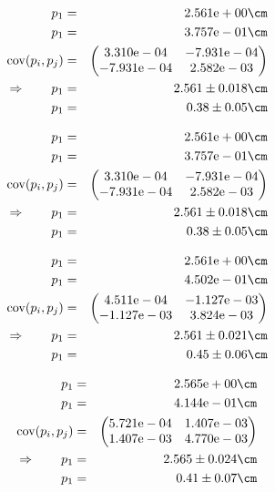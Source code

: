\begin{eqnarray}
    p_1 &=& 2.561\mathrm{e}+00 \cm \nonumber \\
    p_1 &=& 3.757\mathrm{e}-01 \cm \nonumber \\
    \mathrm{cov}(p_i, p_j) &=& 
    \begin{pmatrix}
        3.310\mathrm{e}-04 &-7.931\mathrm{e}-04 \\
        -7.931\mathrm{e}-04 &2.582\mathrm{e}-03 \\
    \end{pmatrix}
\\ \Rightarrow \qquad
    p_1 &=& 2.561 \pm 0.018 \cm\\
    p_1 &=& 0.38 \pm 0.05 \cm
\end{eqnarray}

\begin{eqnarray}
    p_1 &=& 2.561\mathrm{e}+00 \cm \nonumber \\
    p_1 &=& 3.757\mathrm{e}-01 \cm \nonumber \\
    \mathrm{cov}(p_i, p_j) &=& 
    \begin{pmatrix}
        3.310\mathrm{e}-04 &-7.931\mathrm{e}-04 \\
        -7.931\mathrm{e}-04 &2.582\mathrm{e}-03 \\
    \end{pmatrix}
\\ \Rightarrow \qquad
    p_1 &=& 2.561 \pm 0.018 \cm\\
    p_1 &=& 0.38 \pm 0.05 \cm
\end{eqnarray}

\begin{eqnarray}
    p_1 &=& 2.561\mathrm{e}+00 \cm \nonumber \\
    p_1 &=& 4.502\mathrm{e}-01 \cm \nonumber \\
    \mathrm{cov}(p_i, p_j) &=& 
    \begin{pmatrix}
        4.511\mathrm{e}-04 &-1.127\mathrm{e}-03 \\
        -1.127\mathrm{e}-03 &3.824\mathrm{e}-03 \\
    \end{pmatrix}
\\ \Rightarrow \qquad
    p_1 &=& 2.561 \pm 0.021 \cm\\
    p_1 &=& 0.45 \pm 0.06 \cm
\end{eqnarray}

\begin{eqnarray}
    p_1 &=& 2.565\mathrm{e}+00 \cm \nonumber \\
    p_1 &=& 4.144\mathrm{e}-01 \cm \nonumber \\
    \mathrm{cov}(p_i, p_j) &=& 
    \begin{pmatrix}
        5.721\mathrm{e}-04 &1.407\mathrm{e}-03 \\
        1.407\mathrm{e}-03 &4.770\mathrm{e}-03 \\
    \end{pmatrix}
\\ \Rightarrow \qquad
    p_1 &=& 2.565 \pm 0.024 \cm\\
    p_1 &=& 0.41 \pm 0.07 \cm
\end{eqnarray}

